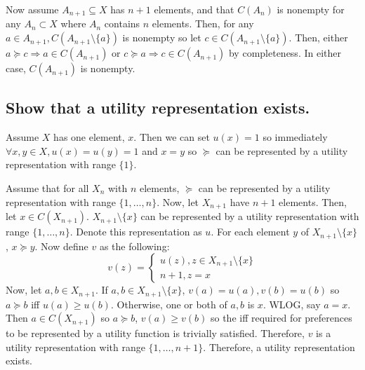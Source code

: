 \documentclass[11pt]{article} %
\begin{document}
Now assume $A_{n+1}\subseteq X$ has $n+1$ elements, and that $C(A_n)$ is nonempty for any $A_n \subset X$ where $A_n$ contains $n$ elements. Then, for any $a \in A_{n+1}, C(A_{n+1} \setminus \{ a\})$ is nonempty so let $c \in  C(A_{n+1} \setminus \{ a\}).$ Then, either $a \succeq c \Rightarrow a \in C(A_{n+1})$ or $c\succeq a \Rightarrow c \in C(A_{n+1})$ by completeness. In either case, $C(A_{n+1})$ is nonempty.
\subsection{Show that a utility representation exists.}
Assume $X$ has one element, $x$. Then we can set $u(x) = 1$ so immediately $\forall x,y \in X, u(x) = u(y) = 1$ and $x = y$ so $\succeq$ can be represented by a utility representation with range $\{ 1\}$.

Assume that for all $X_n$ with $n$ elements, $\succeq$ can be represented by a utility representation with range $\{ 1 ,\dots, n\}$. Now, let $X_{n+1}$ have $n+1$ elements. Then, let $x\in C(X_{n+1}).$ $X_{n+1}\setminus \{x \}$ can be represented by a utility representation with range  $\{ 1 ,\dots, n\}$. Denote this representation as $u$. For each element $y$ of $X_{n+1}\setminus \{x\}$, $x \succeq y$. Now define $v$ as the following:
\begin{equation*}
v(z) = \begin{cases}u(z), z \in X_{n+1}\setminus \{x\} \\  n+1, z=x \end{cases}
\end{equation*} 
Now, let $a,b\in X_{n+1}.$ If $a,b \in X_{n+1} \setminus \{x\}$, $v(a)=u(a),v(b)=u(b)$ so $a\succeq b$ iff $u(a)\geq u(b).$ Otherwise, one or both of $a,b$ is $x$. WLOG, say $a=x$.  Then $a\in C(X_{n+1})$ so $a\succeq b$, $v(a)\geq v(b)$ so the iff required for preferences to be represented by a utility function is trivially satisfied. Therefore, $v$ is a utility representation with range $\{ 1,\dots,n+1\}$. Therefore, a utility representation exists.
\end{document}
